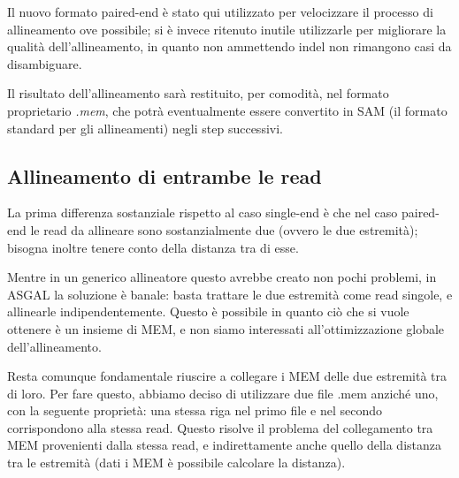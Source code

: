
Il nuovo formato paired-end è stato qui utilizzato per velocizzare il processo di allineamento ove possibile; si è invece ritenuto inutile utilizzarle per migliorare la qualità dell'allineamento, in quanto non ammettendo indel non rimangono casi da disambiguare.

Il risultato dell'allineamento sarà restituito, per comodità, nel formato proprietario \textit{.mem}, che potrà eventualmente essere convertito in SAM (il formato standard per gli allineamenti) negli step successivi.

\newpage

\subsection{Allineamento di entrambe le read}
La prima differenza sostanziale rispetto al caso single-end è che nel caso paired-end le read da allineare sono sostanzialmente due (ovvero le due estremità); bisogna inoltre tenere conto della distanza tra di esse. 

Mentre in un generico allineatore questo avrebbe creato non pochi problemi, in ASGAL la soluzione è banale: basta trattare le due estremità come read singole, e allinearle indipendentemente. Questo è possibile in quanto ciò che si vuole ottenere è un insieme di MEM, e non siamo interessati all'ottimizzazione globale dell'allineamento. %

Resta comunque fondamentale riuscire a collegare i MEM delle due estremità tra di loro. Per fare questo, abbiamo deciso di utilizzare due file .mem anziché uno, con la seguente proprietà: una stessa riga nel primo file e nel secondo corrispondono alla stessa read. Questo risolve il problema del collegamento tra MEM provenienti dalla stessa read, e indirettamente anche quello della distanza tra le estremità (dati i MEM è possibile calcolare la distanza).

